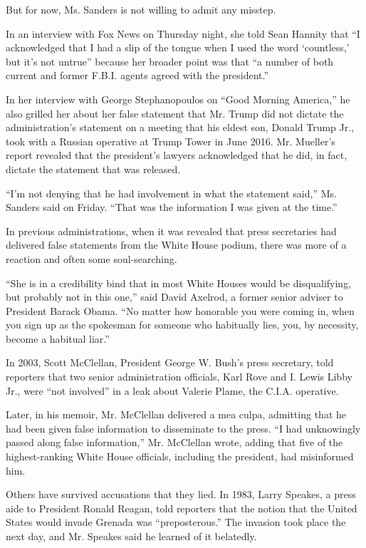 But for now, Ms. Sanders is not willing to admit any misstep.

In an interview with Fox News on Thursday night, she told Sean Hannity
that ``I acknowledged that I had a slip of the tongue when I used the
word `countless,' but it's not untrue'' because her broader point was
that ``a number of both current and former F.B.I. agents agreed with the
president.''

In her interview with George Stephanopoulos on ``Good Morning America,''
he also grilled her about her false statement that Mr. Trump did not
dictate the administration's statement on a meeting that his eldest son,
Donald Trump Jr., took with a Russian operative at Trump Tower in June
2016. Mr. Mueller's report revealed that the president's lawyers
acknowledged that he did, in fact, dictate the statement that was
released.

``I'm not denying that he had involvement in what the statement said,''
Ms. Sanders said on Friday. ``That was the information I was given at
the time.''

In previous administrations, when it was revealed that press secretaries
had delivered false statements from the White House podium, there was
more of a reaction and often some soul-searching.

``She is in a credibility bind that in most White Houses would be
disqualifying, but probably not in this one,'' said David Axelrod, a
former senior adviser to President Barack Obama. ``No matter how
honorable you were coming in, when you sign up as the spokesman for
someone who habitually lies, you, by necessity, become a habitual
liar.''

In 2003, Scott McClellan, President George W. Bush's press secretary,
told reporters that two senior administration officials, Karl Rove and
I. Lewis Libby Jr., were ``not involved'' in a leak about Valerie Plame,
the C.I.A. operative.

Later, in his memoir, Mr. McClellan delivered a mea culpa, admitting
that he had been given false information to disseminate to the press.
``I had unknowingly passed along false information,'' Mr. McClellan
wrote, adding that five of the highest-ranking White House officials,
including the president, had misinformed him.

Others have survived accusations that they lied. In 1983, Larry Speakes,
a press aide to President Ronald Reagan, told reporters that the notion
that the United States would invade Grenada was ``preposterous.'' The
invasion took place the next day, and Mr. Speakes said he learned of it
belatedly.

